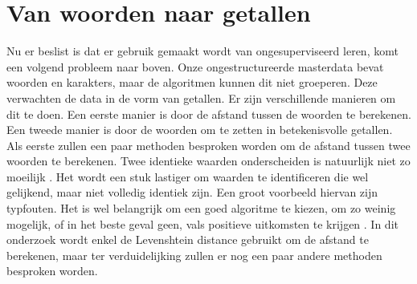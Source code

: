 \section{Van woorden naar getallen}
Nu er beslist is dat er gebruik gemaakt wordt van ongesuperviseerd leren, komt een volgend probleem naar boven. Onze ongestructureerde masterdata bevat woorden en karakters, maar de algoritmen kunnen dit niet groeperen. Deze verwachten de data in de vorm van getallen. Er zijn verschillende manieren om dit te doen. Een eerste manier is door de afstand tussen de woorden te berekenen. Een tweede manier is door de woorden om te zetten in betekenisvolle getallen.
\\\indent
Als eerste zullen een paar methoden besproken worden om de afstand tussen twee woorden te berekenen. Twee identieke waarden onderscheiden is natuurlijk niet zo moeilijk \autocite{Lievens2022}. Het wordt een stuk lastiger om waarden te identificeren die wel gelijkend, maar niet volledig identiek zijn. Een groot voorbeeld hiervan zijn typfouten. Het is wel belangrijk om een goed algoritme te kiezen, om zo weinig mogelijk, of in het beste geval geen, vals positieve uitkomsten te krijgen \autocite{Silva2022}. In dit onderzoek wordt enkel de Levenshtein distance gebruikt om de afstand te berekenen, maar ter verduidelijking zullen er nog een paar andere methoden besproken worden.


